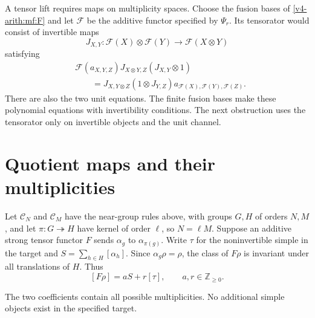 A tensor lift requires maps on multiplicity spaces.
Choose the fusion bases of \eqref{v4-arith:mf:F} and let
\(\mathscr F\) be the additive functor specified by \(\Psi_r\).
Its tensorator would consist of invertible maps
\[
 J_{X,Y}:\mathscr F(X)\otimes\mathscr F(Y)
              \longrightarrow\mathscr F(X\otimes Y)
\]
satisfying
\begin{equation}
\begin{aligned}
 &\mathscr F(a_{X,Y,Z})J_{X\otimes Y,Z}(J_{X,Y}\otimes1)\\
 &\qquad=J_{X,Y\otimes Z}(1\otimes J_{Y,Z})
       a_{\mathscr F(X),\mathscr F(Y),\mathscr F(Z)}.
\end{aligned}
 \label{v4-arith:at:tensorator-equation}
\end{equation}
There are also the two unit equations.
The finite fusion bases make these polynomial equations with
invertibility conditions. The next obstruction uses the
tensorator only on invertible objects and the unit channel.


\section{Quotient maps and their multiplicities}\label{v4-arith:at:sec:norm}

Let $\mathcal C_N$ and $\mathcal C_M$ have the near-group rules above, with groups $G,H$ of
orders $N,M$, and let $\pi:G\twoheadrightarrow H$ have kernel of order $\ell$, so $N=\ell M$.
Suppose
an additive strong tensor functor $F$ sends $\alpha_g$ to $\alpha_{\pi(g)}$. Write $\tau$ for
the noninvertible simple in the target and $S=\sum_{h\in H}[\alpha_h]$. Since
$\alpha_g\rho=\rho$, the class of $F\rho$ is invariant under all translations of $H$. Thus
\[
 [F\rho]=aS+r[\tau],\qquad a,r\in\mathbb Z_{\ge0}.
\]

The two coefficients contain all possible multiplicities. No additional simple objects exist in
the specified target.

